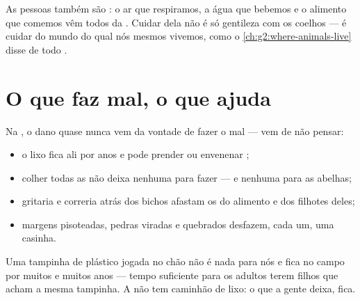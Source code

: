 \begin{remark}\label{rem:g2:caring-for-nature:part}
As pessoas também são : o ar que respiramos, a água que
bebemos e o alimento que comemos vêm todos da . Cuidar dela
não é só gentileza com os coelhos --- é cuidar do mundo do qual nós
mesmos vivemos, como o \cref{ch:g2:where-animals-live} disse de todo
.
\end{remark}

\section{O que faz mal, o que ajuda}

\begin{proposition}\label{prop:g2:caring-for-nature:harm}
Na , o dano quase nunca vem da vontade de fazer o mal ---
vem de não pensar:
\begin{itemize}
  \item o lixo fica ali por anos e pode prender ou envenenar
        ;
  \item colher todas as  não deixa nenhuma para fazer
         --- e nenhuma para as abelhas;
  \item gritaria e correria atrás dos bichos afastam os  do
        alimento e dos filhotes deles;
  \item margens pisoteadas, pedras viradas e  quebrados
        desfazem, cada um, uma casinha.
\end{itemize}
\end{proposition}
\admitted

\begin{example}\label{ex:g2:caring-for-nature:cap}
Uma tampinha de plástico jogada no chão não é nada para nós e fica
no campo por muitos e muitos anos --- tempo suficiente para os
adultos terem filhos que acham a mesma tampinha. A  não tem
caminhão de lixo: o que a gente deixa, fica.
\end{example}

